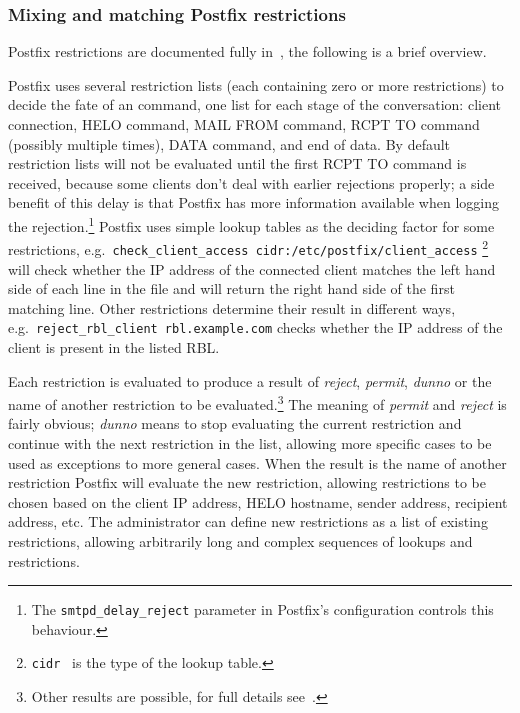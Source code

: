 \documentclass[a4paper,12pt,draft]{article}
\begin{document}
\subsubsection{Mixing and matching Postfix restrictions}

Postfix restrictions are documented fully in~\cite{smtpd_access_readme,
smtpd_per_user_control, policy-servers}, the following is a brief overview.

Postfix uses several restriction lists (each containing zero or more
restrictions) to decide the fate of an \SMTP{} command, one list for each
stage of the \SMTP{} conversation: client connection, HELO command, MAIL
FROM command, RCPT TO command (possibly multiple times), DATA command, and
end of data.  By default restriction lists will not be evaluated until the
first RCPT TO command is received, because some clients don't deal with
earlier rejections properly; a side benefit of this delay is that Postfix
has more information available when logging the rejection.\footnote{The
\texttt{smtpd\_delay\_reject} parameter in Postfix's configuration controls
this behaviour.}  Postfix uses simple lookup tables as the deciding factor
for some restrictions, e.g.\
\texttt{check\_client\_access~cidr:/etc/postfix/client\_access}
\footnote{\texttt{cidr}~\cite{cidr_table} is the type of the lookup table.}
will check whether the IP address of the connected client matches the left
hand side of each line in the file and will return the right hand side of
the first matching line.  Other restrictions determine their result in
different ways, e.g.\ \texttt{reject\_rbl\_client rbl.example.com} checks
whether the IP address of the client is present in the listed RBL\@.

Each restriction is evaluated to produce a result of \textit{reject},
\textit{permit}, \textit{dunno\/} or the name of another restriction to be
evaluated.\footnote{Other results are possible, for full details
see~\cite{smtpd_access_readme, smtpd_per_user_control, policy-servers}.}
The meaning of \textit{permit\/} and \textit{reject\/} is fairly obvious;
\textit{dunno\/} means to stop evaluating the current restriction and
continue with the next restriction in the list, allowing more specific
cases to be used as exceptions to more general cases.  When the result is
the name of another restriction Postfix will evaluate the new restriction,
allowing restrictions to be chosen based on the client IP address, HELO
hostname, sender address, recipient address, etc.  The administrator can
define new restrictions as a list of existing restrictions, allowing
arbitrarily long and complex sequences of lookups and restrictions.
\end{document}
